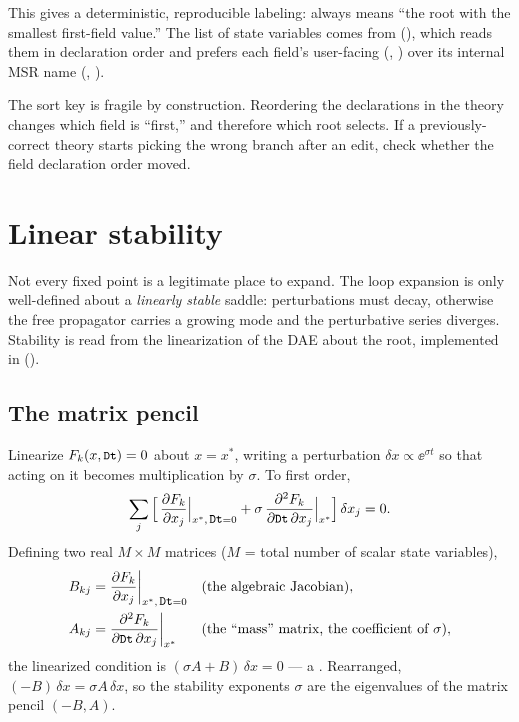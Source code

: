 This gives a deterministic, reproducible labeling: 
always means ``the root with the smallest first-field value.'' The list of state
variables comes from  (),
which reads them in declaration order and prefers each field's user-facing
 (, ) over its internal MSR name
(, ).

\begin{gotcha}
The sort key is fragile by construction. Reordering the 
declarations in the theory changes which field is ``first,'' and therefore which
root  selects. If a previously-correct theory starts
picking the wrong branch after an edit, check whether the field declaration order
moved.
\end{gotcha}

\section{Linear stability}

Not every fixed point is a legitimate place to expand. The loop expansion is only
well-defined about a \emph{linearly stable} saddle: perturbations must decay,
otherwise the free propagator carries a growing mode and the perturbative series
diverges. Stability is read from the linearization of the DAE about the root,
implemented in  ().

\subsection{The matrix pencil}

Linearize $F_k(x,\texttt{\small Dt}) = 0$ about $x = x^{*}$, writing a perturbation
$\delta x \propto \ee^{\sigma t}$ so that  acting on it becomes
multiplication by $\sigma$. To first order,
\begin{equation}
  \sum_j \Big[\,\frac{\partial F_k}{\partial x_j}\Big|_{x^{*},\,\texttt{\small Dt}=0}
    + \sigma\,\frac{\partial^{2} F_k}{\partial \texttt{\small Dt}\,\partial x_j}\Big|_{x^{*}}
    \Big]\,\delta x_j = 0.
\end{equation}
Defining two real $M\times M$ matrices ($M$ = total number of scalar state
variables),
\begin{align}
  B_{kj} &= \frac{\partial F_k}{\partial x_j}\bigg|_{x^{*},\,\texttt{\small Dt}=0}
    && \text{(the algebraic Jacobian)}, \\
  A_{kj} &= \frac{\partial^{2} F_k}{\partial \texttt{\small Dt}\,\partial x_j}\bigg|_{x^{*}}
    && \text{(the ``mass'' matrix, the coefficient of $\sigma$)},
\end{align}
the linearized condition is $(\sigma A + B)\,\delta x = 0$ --- a
. Rearranged,
$(-B)\,\delta x = \sigma A\,\delta x$, so the stability exponents $\sigma$ are the
eigenvalues of the matrix pencil $(-B, A)$.

